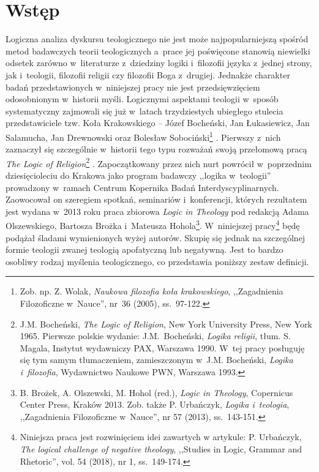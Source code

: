 \chapter{Wstęp}

Logiczna analiza dyskursu teologicznego nie jest może najpopularniejszą spośród metod badawczych teorii teologicznych a~prace jej poświęcone stanowią niewielki odsetek zarówno w~literaturze z~dziedziny logiki i~filozofii języka z~jednej strony, jak i~teologii, filozofii religii czy filozofii Boga z~drugiej. Jednakże charakter badań przedstawionych w~niniejszej pracy nie jest przedsięwzięciem odosobnionym w~historii myśli. Logicznymi aspektami teologii w~sposób systematyczny zajmowali się już w~latach trzydziestych ubiegłego stulecia przedstawiciele tzw. Koła Krakowskiego -- Józef Bocheński, Jan Łukasiewicz, Jan Salamucha, Jan Drewnowski oraz Bolesław Sobociński\footnote{Zob. np. Z. Wolak, \textit{Naukowa filozofia koła krakowskiego}, ,,Zagadnienia Filozoficzne w~Nauce'', nr~36 (2005), ss.~97-122.} . Pierwszy z~nich zaznaczył się szczególnie w~historii tego typu rozważań swoją przełomową pracą \textit{The Logic of Religion}\footnote{J.M. Bocheński, \textit{The Logic of Religion}, New York University Press, New York 1965. Pierwsze polskie wydanie: J.M.~Bocheński, \textit{Logika religii}, tłum. S. Magala, Instytut wydawniczy PAX, Warszawa 1990. W~tej pracy posługuję się tym samym tłumaczeniem, zamieszczonym w~J.M. Bocheński, \textit{Logika i~filozofia}, Wydawnictwo Naukowe PWN, Warszawa 1993.} . Zapoczątkowany przez nich nurt powrócił w~poprzednim dziesięcioleciu do Krakowa jako program badawczy ,,logika w~teologii'' prowadzony w~ramach Centrum Kopernika Badań Interdyscyplinarnych. Zaowocował on szeregiem spotkań, seminariów i~konferencji, których rezultatem jest wydana w~2013 roku praca zbiorowa \textit{Logic in Theology} pod redakcją Adama Olszewskiego, Bartosza Brożka i~Mateusza Hohola\footnote{B. Brożek, A. Olszewski, M. Hohol (red.), \textit{Logic in Theology}, Copernicus Center Press, Kraków 2013. Zob. także P. Urbańczyk, \textit{Logika i~teologia}, ,,Zagadnienia Filozoficzne w~Nauce'', nr 57 (2013), ss.~143-151.}. W~niniejszej pracy\footnote{Niniejsza praca jest
rozwinięciem idei zawartych w artykule: P. Urbańczyk, \textit{The logical challenge of negative theology}, ,,Studies in Logic, Grammar and Rhetoric'', vol. 54 (2018), nr 1, ss.~149-174.} będę podążał śladami wymienionych wyżej autorów. Skupię się jednak na szczególnej formie teologii zwanej teologią apofatyczną lub negatywną. Jest to bardzo osobliwy rodzaj myślenia teologicznego, co przedstawia poniższy zestaw definicji.


